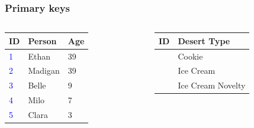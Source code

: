 \documentclass[aspectratio=169]{beamer}
\begin{document}
\begin{frame}
  \frametitle{Primary keys}

  \begin{columns}[T]
    \begin{column}{0.3\textwidth}
      \begin{table}[]
        \footnotesize
        \begin{tabular}{@{}lll@{}}
          \toprule
          ID                  & Person  & Age \\ \midrule
          \textcolor{blue}{1} & Ethan   & 39  \\
          \textcolor{blue}{2} & Madigan & 39  \\
          \textcolor{blue}{3} & Belle   & 9   \\
          \textcolor{blue}{4} & Milo    & 7   \\
          \textcolor{blue}{5} & Clara   & 3   \\ \bottomrule
        \end{tabular}
      \end{table}
    \end{column}
    \begin{column}{0.5\textwidth}
      \begin{table}[]
        \footnotesize
        \begin{tabular}{@{}ll@{}}
          \toprule
          ID              & Desert Type       \\ \midrule
          \color{blue}{1} & Cookie            \\
          \color{blue}{2} & Ice Cream         \\
          \color{blue}{3} & Ice Cream Novelty \\ \bottomrule
        \end{tabular}
      \end{table}
    \end{column}
  \end{columns}


\end{frame}
\end{document}
